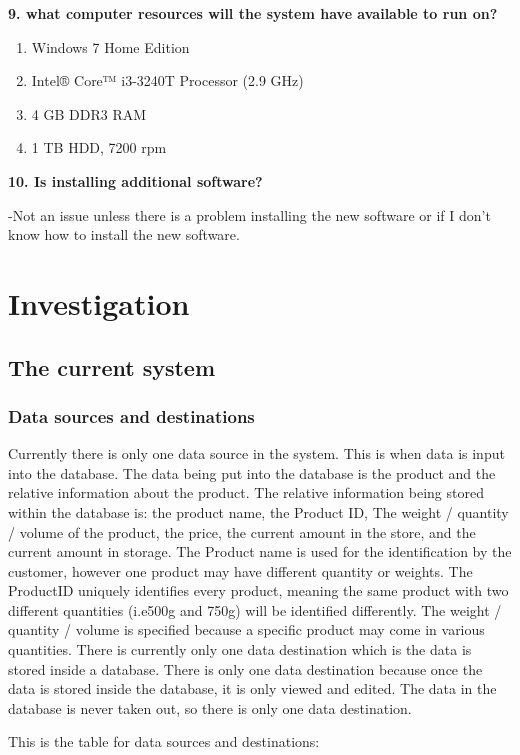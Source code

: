 \begin{flushleft}
\textbf{9. what computer resources will the system have available to run on?}\par

\begin{enumerate}
\item Windows 7 Home Edition
\item Intel® Core™ i3-3240T Processor (2.9 GHz)
\item 4 GB DDR3 RAM
\item 1 TB HDD, 7200 rpm
\end{enumerate}



\textbf{10. Is installing additional software?}\par
-Not an issue unless there is a problem installing the new software or if I don't know how to install the new software.\par

\end{flushleft}

\section{Investigation}


\subsection{The current system}

\subsubsection{Data sources and destinations}
\begin{flushleft}
Currently there is only one data source in the system. This is when data is input into the database. The data being put into the database is the product and the relative information about the product. The relative information being stored within the database is: the product name, the Product ID, The weight / quantity / volume of the product, the price, the current amount in the store, and the current amount in storage. The Product name is used for the identification by the customer, however one product may have different quantity or weights. The ProductID uniquely identifies every product, meaning the same product with two different quantities (i.e500g and 750g) will be identified differently. The weight / quantity / volume is specified because a specific product may come in various quantities. There is currently only one data destination which is the data is stored inside a database. There is only one data destination because once the data is stored inside the database, it is only viewed and edited. The data in the database is never taken out, so there is only one data destination.

This is the table for data sources and destinations:\par
\end{flushleft}


